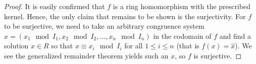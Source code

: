 \begin{proof}
	It is easily confirmed that \(f\) is a ring homomorphism with the prescribed kernel. Hence, the only claim that remains to be shown is the surjectivity. For \(f\) to be surjective, we need to take an arbitrary congruence system \( \hat{x} = \left(x_1 \mod I_1, x_2 \mod I_2, \ldots, x_{n} \mod I_{n}  \right) \) in the codomain of \(f\) and find a solution \(x \in R\) so that \(x \equiv x_{i} \mod I_{i}\) for all \(1 \le i \le n\) (that is \(f\left( x \right) = \hat{x}\)). We see the generalized remainder theorem yields such an \(x\), so \(f\) is surjective.
\end{proof}
